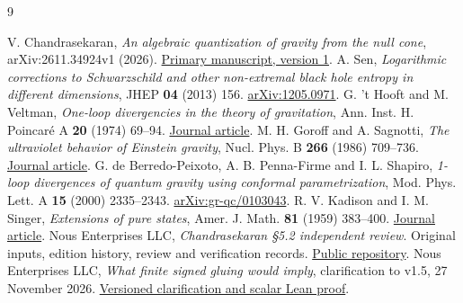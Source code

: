\documentclass[11pt]{article}
\begin{document}
\clearpage{}
\begin{thebibliography}{9}\raggedright
{} V. Chandrasekaran, \emph{An algebraic quantization of gravity from the null cone}, arXiv:2611.34924v1 (2026). \href{https://arxiv.org/abs/2611.34924v1}{Primary manuscript, version 1}.
 A. Sen, \emph{Logarithmic corrections to Schwarzschild and other non-extremal black hole entropy in different dimensions}, JHEP \textbf{04} (2013) 156. \href{https://arxiv.org/abs/1205.0971}{arXiv:1205.0971}.
 G. 't Hooft and M. Veltman, \emph{One-loop divergencies in the theory of gravitation}, Ann. Inst. H. Poincar\'e A \textbf{20} (1974) 69--94. \href{https://www.numdam.org/item/AIHPA_1974__20_1_69_0/}{Journal article}.
 M. H. Goroff and A. Sagnotti, \emph{The ultraviolet behavior of Einstein gravity}, Nucl. Phys. B \textbf{266} (1986) 709--736. \href{https://doi.org/10.1016/0550-3213(86)90193-8}{Journal article}.
 G. de Berredo-Peixoto, A. B. Penna-Firme and I. L. Shapiro, \emph{1-loop divergences of quantum gravity using conformal parametrization}, Mod. Phys. Lett. A \textbf{15} (2000) 2335--2343. \href{https://arxiv.org/abs/gr-qc/0103043}{arXiv:gr-qc/0103043}.
 R. V. Kadison and I. M. Singer, \emph{Extensions of pure states}, Amer. J. Math. \textbf{81} (1959) 383--400. \href{https://doi.org/10.2307/2372748}{Journal article}.
 Nous Enterprises LLC, \emph{Chandrasekaran \S5.2 independent review}. Original inputs, edition history, review and verification records. \href{https://github.com/nousentllc/chandrasekaran-section-5-2-review}{Public repository}.
 Nous Enterprises LLC, \emph{What finite signed gluing would imply}, clarification to v1.5, 27 November 2026. \href{https://github.com/nousentllc/chandrasekaran-section-5-2-review/tree/1f4e23ee1c9271ff360d672286555ef0373c7ce2/reviews/v1.5-clarification}{Versioned clarification and scalar Lean proof}.
\end{thebibliography}
\end{document}
